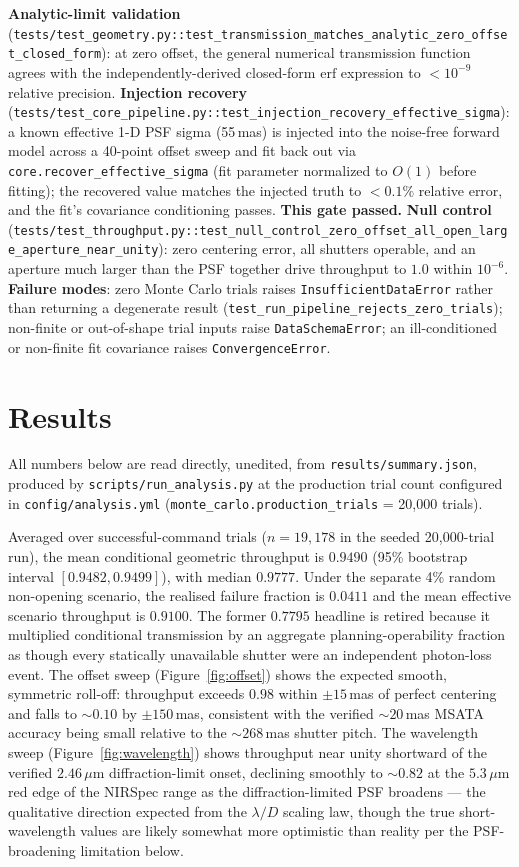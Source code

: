 \documentclass[11pt]{article}
\begin{document}
\textbf{Analytic-limit validation}
(\texttt{tests/test\_geometry.py::test\_transmission\_matches\_analytic\_zero\_offset\_closed\_form}):
at zero offset, the general numerical transmission function agrees with the
independently-derived closed-form $\mathrm{erf}$ expression to $<10^{-9}$
relative precision. \textbf{Injection recovery}
(\texttt{tests/test\_core\_pipeline.py::test\_injection\_recovery\_effective\_sigma}):
a known effective 1-D PSF sigma (55\,mas) is injected into the noise-free
forward model across a 40-point offset sweep and fit back out via
\texttt{core.recover\_effective\_sigma} (fit parameter normalized to $O(1)$
before fitting); the recovered value matches the injected truth to
$<0.1\%$ relative error, and the fit's covariance conditioning passes.
\textbf{This gate passed.} \textbf{Null control}
(\texttt{tests/test\_throughput.py::test\_null\_control\_zero\_offset\_all\_open\_large\_aperture\_near\_unity}):
zero centering error, all shutters operable, and an aperture much larger than
the PSF together drive throughput to $1.0$ within $10^{-6}$.
\textbf{Failure modes}: zero Monte Carlo trials raises
\texttt{InsufficientDataError} rather than returning a degenerate result
(\texttt{test\_run\_pipeline\_rejects\_zero\_trials}); non-finite or
out-of-shape trial inputs raise \texttt{DataSchemaError}; an ill-conditioned
or non-finite fit covariance raises \texttt{ConvergenceError}.

\section{Results}
\label{sec:results}
All numbers below are read directly, unedited, from
\texttt{results/summary.json}, produced by \texttt{scripts/run\_analysis.py}
at the production trial count configured in
\texttt{config/analysis.yml} (\texttt{monte\_carlo.production\_trials} =
20{,}000 trials).

Averaged over successful-command trials ($n=19{,}178$ in the seeded
20{,}000-trial run), the mean conditional geometric throughput is $0.9490$
(95\% bootstrap interval $[0.9482, 0.9499]$), with median $0.9777$. Under the
separate 4\% random non-opening scenario, the realised failure fraction is
$0.0411$ and the mean effective scenario throughput is $0.9100$. The former
$0.7795$ headline is retired because it multiplied conditional transmission
by an aggregate planning-operability fraction as though every statically
unavailable shutter were an independent photon-loss event. The
offset sweep (Figure~\ref{fig:offset}) shows the expected smooth,
symmetric roll-off: throughput exceeds $0.98$ within $\pm 15$\,mas of
perfect centering and falls to $\sim\!0.10$ by $\pm 150$\,mas, consistent
with the verified $\sim\!20$\,mas MSATA accuracy being small relative to
the $\sim\!268$\,mas shutter pitch. The wavelength sweep
(Figure~\ref{fig:wavelength}) shows throughput near unity shortward of the
verified $2.46\,\mu$m diffraction-limit onset, declining smoothly to
$\sim\!0.82$ at the $5.3\,\mu$m red edge of the NIRSpec range as the
diffraction-limited PSF broadens --- the qualitative direction expected from
the $\lambda/D$ scaling law, though the true short-wavelength values are
likely somewhat more optimistic than reality per the PSF-broadening
limitation below.
\end{document}
